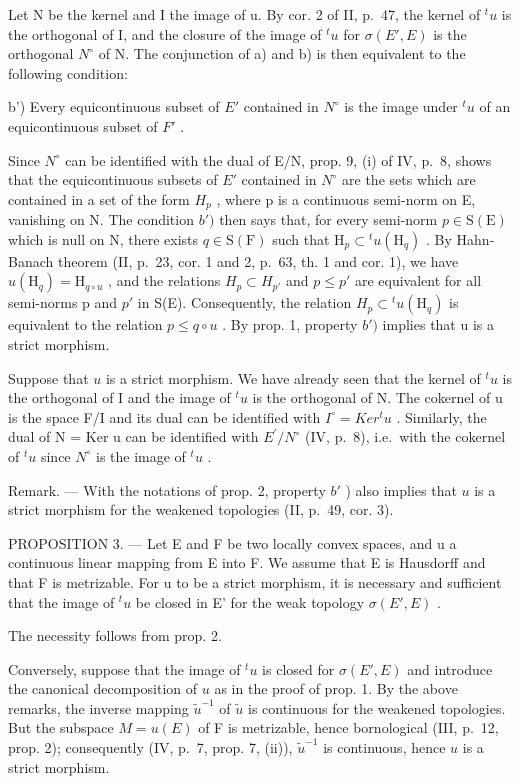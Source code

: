 Let N be the kernel and I the image of u. By cor. 2 of II, p.~47, the kernel of \(^{t}u\) is the orthogonal of I, and the closure of the image of \(^{t}u\) for \(\sigma(E', E)\) is the orthogonal \(N^{\circ}\) of N. The conjunction of a) and b) is then equivalent to the following condition:

b') Every equicontinuous subset of \(E'\) contained in \(N^{\circ}\) is the image under \(^{t}u\) of an equicontinuous subset of \(F'\) .

Since \(N^{\circ}\) can be identified with the dual of E/N, prop. 9, (i) of IV, p.~8, shows that the equicontinuous subsets of \(E'\) contained in \(N^{\circ}\) are the sets which are contained in a set of the form \(H_{p}\) , where p is a continuous semi-norm on E, vanishing on N. The condition \(b')\) then says that, for every semi-norm \(p \in \mathrm{S}(\mathrm{E})\) which is null on N, there exists \(q \in \mathrm{S}(\mathrm{F})\) such that \(\mathrm{H}_{p} \subset {}^{t}u(\mathrm{H}_{q})\) . By Hahn-Banach theorem (II, p.~23, cor. 1 and 2, p.~63, th. 1 and cor. 1), we have \(u(\mathrm{H}_{q}) = \mathrm{H}_{q \circ u}\) , and the relations \(H_{p} \subset H_{p'}\) and \(p \leqslant p'\) are equivalent for all semi-norms p and \(p'\) in S(E). Consequently, the relation \(H_{p} \subset {}^{t}u(\mathrm{H}_{q})\) is equivalent to the relation \(p \leqslant q \circ u\) . By prop. 1, property \(b')\) implies that u is a strict morphism.

Suppose that \(u\) is a strict morphism. We have already seen that the kernel of \(^t u\) is the orthogonal of I and the image of \(^t u\) is the orthogonal of N. The cokernel of u is the space F/I and its dual can be identified with \(I^{\circ} = Ker^{t}u\) . Similarly, the dual of N = Ker u can be identified with \(E^{\prime}/N^{\circ}\) (IV, p.~8), i.e.~with the cokernel of \(^{t}u\) since \(N^{\circ}\) is the image of \(^{t}u\) .

Remark. --- With the notations of prop. 2, property \(b'\) ) also implies that \(u\) is a strict morphism for the weakened topologies (II, p.~49, cor. 3).

PROPOSITION 3. --- Let E and F be two locally convex spaces, and u a continuous linear mapping from E into F. We assume that E is Hausdorff and that F is metrizable. For u to be a strict morphism, it is necessary and sufficient that the image of \({}^t u\) be closed in E' for the weak topology \(\sigma(E', E)\) .

The necessity follows from prop. 2.

Conversely, suppose that the image of \(^t u\) is closed for \(\sigma(E', E)\) and introduce the canonical decomposition of \(u\) as in the proof of prop. 1. By the above remarks, the inverse mapping \(\tilde{u}^{-1}\) of \(\tilde{u}\) is continuous for the weakened topologies. But the subspace \(M = u(E)\) of F is metrizable, hence bornological (III, p.~12, prop. 2); consequently (IV, p.~7, prop. 7, (ii)), \(\tilde{u}^{-1}\) is continuous, hence \(u\) is a strict morphism.
\relax{}
